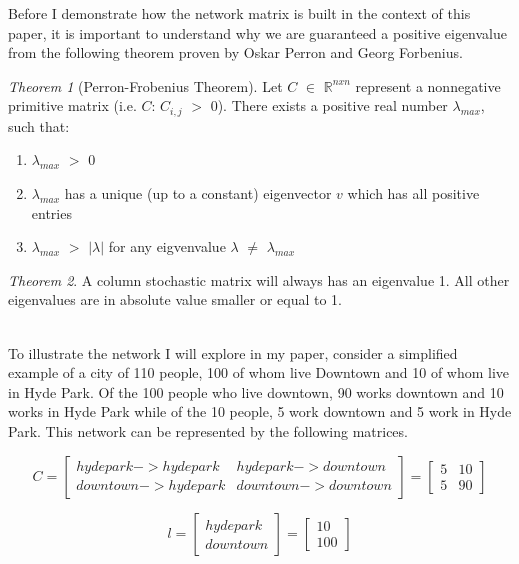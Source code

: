 \documentclass{article}
\theoremstyle{definition}
\theoremstyle{remark}
\newtheorem{theorem}{Theorem}
\begin{document}
Before I demonstrate how the network matrix is built in the context of this paper, it is important to understand why we are guaranteed a positive eigenvalue from the following theorem proven by Oskar Perron and Georg Forbenius.

\theoremstyle{definition}
\begin{theorem}[Perron-Frobenius Theorem]
\label{Perron-Frobenius Theorem}
Let $C$ $\in$ $\mathbb{R}^{nxn}$ represent a nonnegative primitive matrix (i.e. $C$: $C_{i,j}$ $>$ 0).  There exists a positive real number $\lambda_{max}$, such that:
\begin{enumerate}
\item $\lambda_{max}$ $>$ 0
\item $\lambda_{max}$ has a unique (up to a constant) eigenvector $v$ which has all positive entries
\item $\lambda_{max}$ $>$ $|\lambda|$ for any eigvenvalue $\lambda$ $\neq$ $\lambda_{max}$
\end{enumerate}

\end{theorem}

\begin{theorem}
A column stochastic matrix will always has an eigenvalue 1. All other eigenvalues are in absolute
value smaller or equal to 1.
\end{theorem}

\\ 

To illustrate the network I will explore in my paper, consider a simplified example of a city of 110 people, 100 of whom live Downtown and 10 of whom live in Hyde Park.  Of the 100 people who live downtown, 90 works downtown and 10 works in Hyde Park while of the 10 people, 5 work downtown and 5 work in Hyde Park.  This network can be represented by the following matrices. 

\begin{equation}
      C
   =
  \begin{bmatrix}
    hyde park->hyde park  & hyde park->downtown\\
    downtown->hyde park  & downtown->downtown
  \end{bmatrix} = 
  \begin{bmatrix}
    5 & 10\\
    5 & 90 
  \end{bmatrix}
\end{equation}

\begin{equation}
      l
   =
  \begin{bmatrix}
    hyde park\\
    downtown
    
  \end{bmatrix} = 
  \begin{bmatrix}
    10\\
    100 
  \end{bmatrix}
\end{equation}
\end{document}
